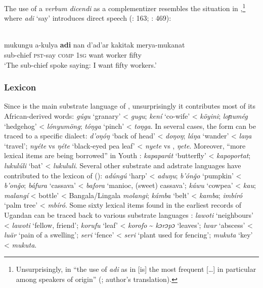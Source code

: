 \documentclass[output=paper]{langsci/langscibook}
\begin{document}
The use of a \textit{verbum} \textit{dicendi} as a {complementizer} resembles the situation in ,\footnote{Unsurprisingly, in   “the use of \textit{adi} as in  [is] the most frequent […] in particular among speakers of  origin” (\citealt[470]{Miller2001}; author's translation).} where \textit{adi} ‘say’ introduces direct speech (\citealt{Owens1997}: 163; \citealt{Miller2001}: 469): 

\ea

{ \citep[469]{Miller2001}}\\
\gll    mukungu a-kulya \textbf{adi} nan d'ad'ar kakitak merya-mukanat\\
                sub-chief \textsc{pst}-say \textsc{comp} 1\textsc{sg} want worker fifty\\
\glt     `The sub-chief spoke saying: I want fifty workers.'
\z


 \subsubsection{Lexicon}

Since  is the main {substrate} language of  , unsurprisingly it contributes most of its African-derived words: \textit{gúgu} ‘granary’ <  \textit{gugu}; \textit{kení} ‘co-wife’ <  \textit{köyini}; \textit{loɲumég} `hedgehog' <  \textit{lónyumöng}; \textit{tóŋga} ‘pinch’ <  \textit{toŋga}. In several cases, the   form can be traced to a specific dialect: \textit{d'oŋóŋ} ‘back of head’ <  \textit{doŋoŋ}; \textit{láŋa} ‘wander’ <  \textit{laŋa} ‘travel’; \textit{nyéte} vs \textit{ŋéte} ‘black-eyed pea leaf’ <  \textit{nyete} vs ,  \textit{ŋete}. Moreover, “more  lexical items are being borrowed” in Youth   \citep[131]{Nakao2012}: \textit{kapaparát} ‘butterfly’ <  \textit{kapoportat}; \textit{lukulúli} ‘bat’ <  \textit{lukululi}. Several other {substrate} and {adstrate} languages have contributed to the lexicon of   (\citealt{Nakao2012,Nakao2015}): \textit{adúngú} ‘harp’ <  \textit{aduŋu}; \textit{b'ónǧ}\textit{o} ‘pumpkin’ <  \textit{b'onǧo}; \textit{báfura} ‘cassava’ <  \textit{bafora} ‘manioc, (sweet) cassava’; \textit{káwu} ‘cowpea’ <  \textit{kau}; \textit{malangí} < bottle’ < Bangala/Lingala \textit{molangi}; \textit{kámba} ‘belt’ <  \textit{kamba}; \textit{imbíró} ‘palm tree’ <  \textit{mbíró}. Some sixty lexical items found in the earliest records of Ugandan  can be traced back to various {substrate} languages \citep{Avram2017talk}: \textit{lawoti} ‘neighbours’ <  \textit{lawoti} ‘fellow, friend’; \textit{korufu} ‘leaf’ <  \textit{korofo} {\textasciitilde} \textit{kɔrɔ}\textit{pɔ} ‘leaves’; \textit{lwar} ‘abscess’ <  \textit{luär} ‘pain of a swelling’; \textit{seri} ‘fence’ <  \textit{seri} ‘plant used for fencing’; \textit{mukuta} ‘key’ <  \textit{mukuta}.
\end{document}
